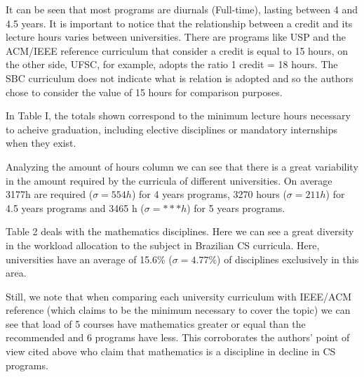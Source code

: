 \documentclass[conference]{IEEEtran}
\begin{document}
	It can be seen that most programs are diurnals (Full-time), lasting between 4 and 4.5 years. It is important to notice that the relationship between a credit and its lecture hours varies between universities. There are programs like USP and the ACM/IEEE reference curriculum that consider a credit is equal to 15 hours, on the other side, UFSC, for example, adopts the ratio 1 credit = 18 hours. The SBC curriculum does not indicate what is relation is adopted and so the authors chose to consider the value of 15 hours for comparison purposes.

	In Table I, the totals shown correspond to the minimum lecture hours necessary to acheive graduation, including elective disciplines or mandatory internships when they exist.

	Analyzing the amount of hours column we can see that there is a great variability in the amount required by the curricula of different universities. On average 3177h are required ($ \sigma = 554h $) for 4 years programs, 3270 hours ($ \sigma = 211h $) for 4.5 years programs and 3465 h ($ \sigma = ***h $) for 5 years programs.

	Table 2 deals with the mathematics disciplines. Here we can see a great diversity in the workload allocation to the subject in Brazilian CS curricula. Here, universities have an average of 15.6\% ($ \sigma = 4.77\% $) of disciplines exclusively in this area.

	Still, we note that when comparing each university curriculum with IEEE/ACM reference (which claims to be the minimum necessary to cover the topic) we can see that load of 5 courses have mathematics greater or equal than the recommended and 6 programs have less. This corroborates the authors' point of view cited above who claim that mathematics is a discipline in decline in CS programs.
\end{document}

